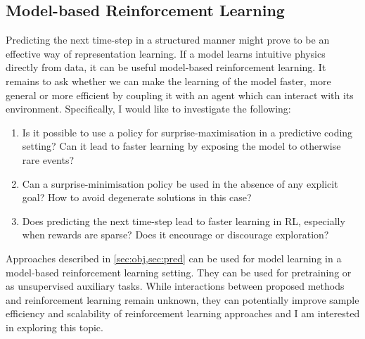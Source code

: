 %    
%    
%    
%    
%    

\subsection{Model-based Reinforcement Learning}

    Predicting the next time-step in a structured manner might prove to be an effective way of representation learning. If a model learns intuitive physics directly from data, it can be useful model-based reinforcement learning. It remains to ask whether we can make the learning of the model faster, more general or more efficient by coupling it with an agent which can interact with its environment. Specifically, I would like to investigate the following:
    \begin{enumerate}
        \item Is it possible to use a policy for surprise-maximisation in a predictive coding setting? Can it lead to faster learning by exposing the model to otherwise rare events? 
        \item Can a surprise-minimisation policy be used in the absence of any explicit goal? How to avoid degenerate solutions in this case?
        \item Does predicting the next time-step lead to faster learning in RL, especially when rewards are sparse? Does it encourage or discourage exploration?
    \end{enumerate} 
    Approaches described in \cref{sec:obj,sec:pred} can be used for model learning in a model-based reinforcement learning setting. They can be used for pretraining or as unsupervised auxiliary tasks. While interactions between proposed methods and reinforcement learning remain unknown, they can potentially improve sample efficiency and scalability of reinforcement learning approaches and I am interested in exploring this topic.

